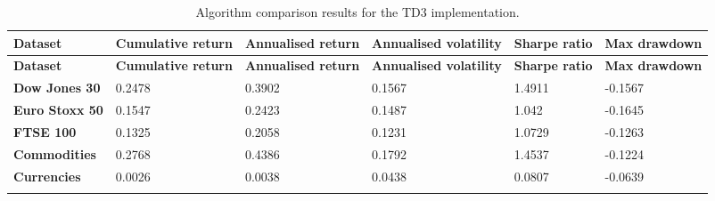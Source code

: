 \begin{longtable}{|l|p{2.1cm}|p{2.1cm}|p{2.1cm}|p{1.5cm}|p{2cm}|}
    \hline
    \textbf{Dataset} & \textbf{Cumulative return} & \textbf{Annualised return} & \textbf{Annualised volatility} & \textbf{Sharpe ratio} & \textbf{Max drawdown}  \\ \midrule
    \endfirsthead

    \hline
    \textbf{Dataset} & \textbf{Cumulative return} & \textbf{Annualised return} & \textbf{Annualised volatility} & \textbf{Sharpe ratio} & \textbf{Max drawdown}  \\ \midrule
    \endhead

    \endfoot
    \hline

    \textbf{Dow Jones 30} & 0.2478 & 0.3902 & 0.1567 & 1.4911 & -0.1567 \\ \hline
    \textbf{Euro Stoxx 50} & 0.1547 & 0.2423 & 0.1487 & 1.042 & -0.1645 \\ \hline
    \textbf{FTSE 100} & 0.1325 & 0.2058 & 0.1231 & 1.0729 & -0.1263 \\ \hline
    \textbf{Commodities} & 0.2768 & 0.4386 & 0.1792 & 1.4537 & -0.1224 \\ \hline
    \textbf{Currencies} & 0.0026 & 0.0038 & 0.0438 & 0.0807 & -0.0639 \\ \hline

    \caption{Algorithm comparison results for the TD3 implementation.}
    \label{tab:experiment_algorithms_td3}
\end{longtable}